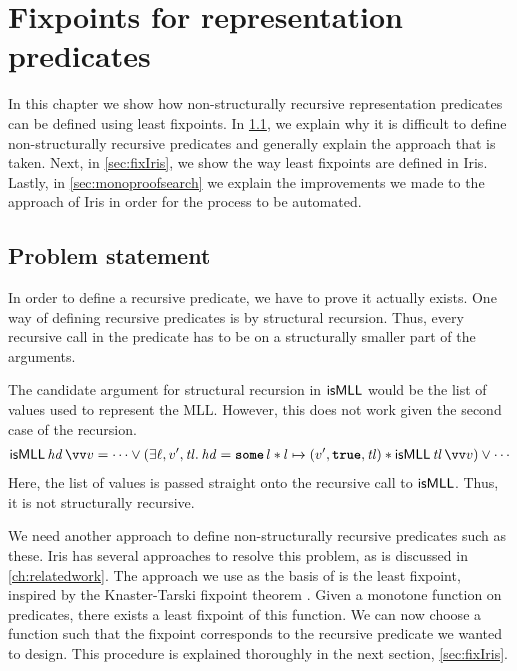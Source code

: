 \documentclass[thesis.tex]{subfiles}
\begin{document}
\chapter{Fixpoints for representation predicates} \label{ch:fixpoints}
In this chapter we show how non-structurally recursive representation predicates can be defined using least fixpoints. In \cref{sec:fixproblem}, we explain why it is difficult to define non-structurally recursive predicates and generally explain the approach that is taken. Next, in \cref{sec:fixIris}, we show the way least fixpoints are defined in Iris. Lastly, in \cref{sec:monoproofsearch} we explain the improvements we made to the approach of Iris in order for the process to be automated.

\section{Problem statement} \label{sec:fixproblem}
In order to define a recursive predicate, we have to prove it actually exists. One way of defining recursive predicates is by structural recursion. Thus, every recursive call in the predicate has to be on a structurally smaller part of the arguments.

The candidate argument for structural recursion in $\textsf{\upshape isMLL}$ would be the list of values used to represent the MLL. However, this does not work given the second case of the recursion.
\begin{align*}
  \isMLL\,\hd\,\vect{\val} = \cdots \lor (\Exists \loc, \val', \tl. \hd = \Some l * l \fmapsto (\val', \True, \tl) * \isMLL\, \tl\, \vect{\val}) \lor \cdots
\end{align*}
Here, the list of values is passed straight onto the recursive call to $\textsf{\upshape isMLL}$. Thus, it is not structurally recursive.

We need another approach to define non-structurally recursive predicates such as these. Iris has several approaches to resolve this problem, as is discussed in \cref{ch:relatedwork}. The approach we use as the basis of  is the least fixpoint, inspired by the Knaster-Tarski fixpoint theorem \cite*{tarskiLatticetheoreticalFixpointTheorem1955}. Given a monotone function on predicates, there exists a least fixpoint of this function. We can now choose a function such that the fixpoint corresponds to the recursive predicate we wanted to design. This procedure is explained thoroughly in the next section, \cref{sec:fixIris}.
\end{document}
